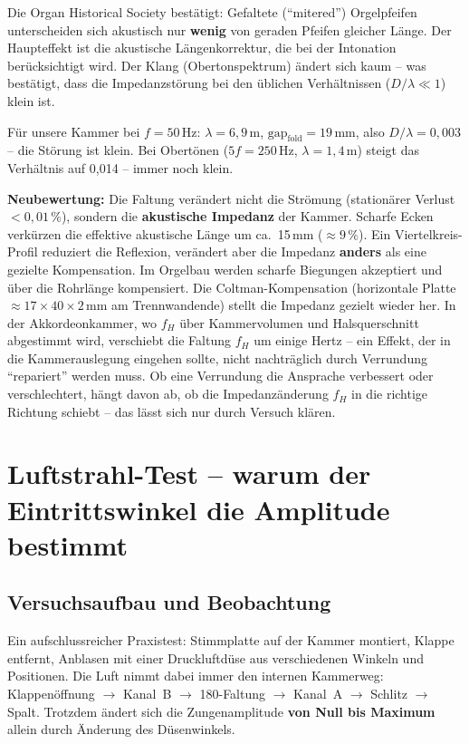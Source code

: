 \documentclass[11pt,a4paper]{article}
\begin{document}
Die Organ Historical Society bestätigt: Gefaltete (``mitered'') Orgelpfeifen unterscheiden sich akustisch nur \textbf{wenig} von geraden Pfeifen gleicher Länge. Der Haupteffekt ist die akustische Längenkorrektur, die bei der Intonation berücksichtigt wird. Der Klang (Obertonspektrum) ändert sich kaum -- was bestätigt, dass die Impedanzstörung bei den üblichen Verhältnissen ($D/\lambda \ll 1$) klein ist.

Für unsere Kammer bei $f = 50$\,Hz: $\lambda = 6{,}9$\,m, $\text{gap}_\text{fold} = 19$\,mm, also $D/\lambda = 0{,}003$ -- die Störung ist klein. Bei Obertönen ($5f = 250$\,Hz, $\lambda = 1{,}4$\,m) steigt das Verhältnis auf 0{,}014 -- immer noch klein.

\begin{keybox}
\textbf{Neubewertung:} Die Faltung verändert nicht die Strömung (stationärer Verlust $< 0{,}01\,\%$), sondern die \textbf{akustische Impedanz} der Kammer. Scharfe Ecken verkürzen die effektive akustische Länge um ca.\ 15\,mm ($\approx 9\,\%$). Ein Viertelkreis-Profil reduziert die Reflexion, verändert aber die Impedanz \textbf{anders} als eine gezielte Kompensation. Im Orgelbau werden scharfe Biegungen akzeptiert und über die Rohrlänge kompensiert. Die Coltman-Kompensation (horizontale Platte $\approx 17 \times 40 \times 2$\,mm am Trennwandende) stellt die Impedanz gezielt wieder her. In der Akkordeonkammer, wo $f_H$ über Kammervolumen und Halsquerschnitt abgestimmt wird, verschiebt die Faltung $f_H$ um einige Hertz -- ein Effekt, der in die Kammerauslegung eingehen sollte, nicht nachträglich durch Verrundung ``repariert'' werden muss. Ob eine Verrundung die Ansprache verbessert oder verschlechtert, hängt davon ab, ob die Impedanzänderung $f_H$ in die richtige Richtung schiebt -- das lässt sich nur durch Versuch klären.
\end{keybox}

\section[Luftstrahl-Test]{Luftstrahl-Test -- warum der Eintrittswinkel die Amplitude bestimmt}

\subsection{Versuchsaufbau und Beobachtung}

Ein aufschlussreicher Praxistest: Stimmplatte auf der Kammer montiert, Klappe entfernt, Anblasen mit einer Druckluftdüse aus verschiedenen Winkeln und Positionen. Die Luft nimmt dabei immer den internen Kammerweg: Klappenöffnung $\rightarrow$ Kanal~B $\rightarrow$ 180\textdegree-Faltung $\rightarrow$ Kanal~A $\rightarrow$ Schlitz $\rightarrow$ Spalt. Trotzdem ändert sich die Zungenamplitude \textbf{von Null bis Maximum} allein durch Änderung des Düsenwinkels.
\end{document}
